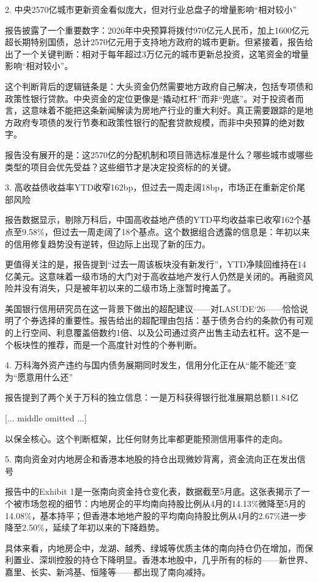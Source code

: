 \documentclass[11pt]{ctexart}
\begin{document}
2. 中央2570亿城市更新资金看似庞大，但对行业总盘子的增量影响“相对较小”

报告披露了一个重要数字：2026年中央预算将拨付970亿元人民币，加上1600亿元超长期特别国债，总计2570亿元用于支持地方政府的城市更新。但紧接着，报告给出了一个关键判断：相对于每年超过3万亿元的城市更新总投资，这笔资金的增量影响“相对较小”。

这个判断背后的逻辑链条是：大头资金仍然需要地方政府自己解决，包括专项债和政策性银行贷款。中央资金的定位更像是“撬动杠杆”而非“兜底”。对于投资者而言，这意味着不能把这条新闻解读为房地产行业的重大利好。真正需要跟踪的是地方政府专项债的发行节奏和政策性银行的配套贷款规模，而非中央预算的绝对数字。

报告没有展开的是：这2570亿的分配机制和项目筛选标准是什么？哪些城市或哪些类型的项目会优先受益？这些细节才是决定投资标的的关键。

3. 高收益债收益率YTD收窄162bp，但过去一周走阔18bp，市场正在重新定价尾部风险

报告数据显示，剔除万科后，中国高收益地产债的YTD平均收益率已收窄162个基点至9.58\%，但过去一周走阔了18个基点。这个数据组合透露的信息是：年初以来的信用修复趋势没有逆转，但边际上出现了新的压力。

更值得关注的是，报告提到“过去一周该板块没有新发行”，YTD净赎回维持在14亿美元。这意味着一级市场的大门对于高收益地产发行人仍然是关闭的。再融资风险并没有消失，只是被年初以来的二级市场上涨暂时掩盖了。

美国银行信用研究员在这一背景下做出的超配建议——对LASUDE‘26——恰恰说明了个券选择的重要性。报告给出的超配理由包括：基于债务合约的条款仍有可观的上行空间、利息覆盖倍数约1倍、以及公司通过资产出售主动去杠杆。这不是一个板块性的推荐，而是一个高度针对性的个券判断。

4. 万科海外资产违约与国内债务展期同时发生，信用分化正在从“能不能还”变为“愿意用什么还”

报告提到了两个关于万科的独立信息：一是万科获得银行批准展期总额11.84亿

[... middle omitted ...]

以保全核心。这个判断框架，比任何财务比率都更能预测信用事件的走向。

5. 南向资金对内地房企和香港本地股的持仓出现微妙背离，资金流向正在发出信号

报告中的Exhibit 1是一张南向资金持仓变化表，数据截至5月底。这张表揭示了一个被市场忽视的细节：内地房企的平均南向持股比例从4月的14.13\%微降至5月的14.08\%，基本持平；但香港本地地产股的平均南向持股比例从4月的2.67\%进一步降至2.50\%，延续了年初以来的下降趋势。

具体来看，内地房企中，龙湖、越秀、绿城等优质主体的南向持仓仍在增加，而保利置业、深圳控股的持仓下降明显。香港本地股中，几乎所有的标的——新世界、嘉里、长实、新鸿基、恒隆等——都出现了南向减持。
\end{document}
